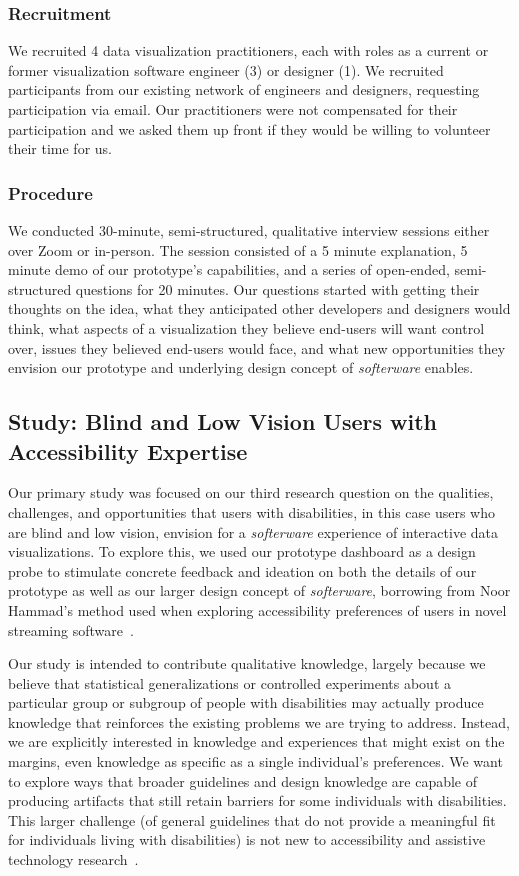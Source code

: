 \documentclass[12pt]{cmuthesis}
\begin{document}
\subsubsection{Recruitment}
We recruited 4 data visualization practitioners, each with roles as a current or former visualization software engineer (3) or designer (1). We recruited participants from our existing network of engineers and designers, requesting participation via email. Our practitioners were not compensated for their participation and we asked them up front if they would be willing to volunteer their time for us.

\subsubsection{Procedure}
We conducted 30-minute, semi-structured, qualitative interview sessions either over Zoom or in-person. The session consisted of a 5 minute explanation, 5 minute demo of our prototype's capabilities, and a series of open-ended, semi-structured questions for 20 minutes. Our questions started with getting their thoughts on the idea, what they anticipated other developers and designers would think, what aspects of a visualization they believe end-users will want control over, issues they believed end-users would face, and what new opportunities they envision our prototype and underlying design concept of \textit{softerware} enables.

\subsection{Study: Blind and Low Vision Users with Accessibility Expertise}

Our primary study was focused on our third research question on the qualities, challenges, and opportunities that users with disabilities, in this case users who are blind and low vision, envision for a \textit{softerware} experience of interactive data visualizations. To explore this, we used our prototype dashboard as a design probe to stimulate concrete feedback and ideation on both the details of our prototype as well as our larger design concept of \textit{softerware}, borrowing from Noor Hammad's method used when exploring accessibility preferences of users in novel streaming software~\cite{Hammad2024GameAware}.

Our study is intended to contribute qualitative knowledge, largely because we believe that statistical generalizations or controlled experiments about a particular group or subgroup of people with disabilities may actually produce knowledge that reinforces the existing problems we are trying to address. Instead, we are explicitly interested in knowledge and experiences that might exist on the margins, even knowledge as specific as a single individual's preferences. We want to explore ways that broader guidelines and design knowledge are capable of producing artifacts that still retain barriers for some individuals with disabilities. This larger challenge (of general guidelines that do not provide a meaningful fit for individuals living with disabilities) is not new to accessibility and assistive technology research~\cite{Power2012Guidelines}.
\end{document}
